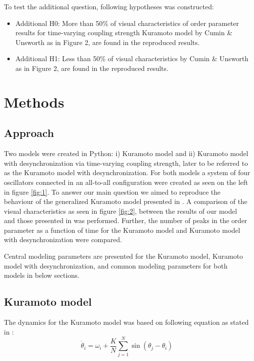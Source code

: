 \documentclass{article}
\begin{document}
To test the additional question, following hypotheses was constructed:
\begin{itemize}
    \item Additional H0: More than 50\% of visual characteristics of order parameter results for time-varying coupling strength Kuramoto model by Cumin \& Unsworth \cite{Cumin} as in Figure 2, are found in the reproduced results.
    \item Additional H1: Less than 50\% of visual characteristics by Cumin \& Unsworth \cite{Cumin} as in Figure 2, are found in the reproduced results.
\end{itemize}

\section{Methods}

\subsection{Approach}
Two models were created in Python: i) Kuramoto model and ii) Kuramoto model with desynchronization via time-varying coupling strength, later to be referred to as the Kuramoto model with desynchronization. For both models a system of four oscillators connected in an all-to-all configuration were created as seen on the left in figure \ref{fig:1}. To answer our main question we aimed to reproduce the behaviour of the generalized Kuramoto model presented in \cite{Cumin}. A comparison of the visual characteristics as seen in figure \ref{fig:2}, between the results of our model and those presented in \cite{Cumin} was performed. Further, the number of peaks in the order parameter as a function of time for the Kuramoto model and Kuramoto model with desynchronization were compared. 

Central modeling parameters are presented for the Kuramoto model, Kuramoto model with desynchronization, and common modeling parameters for both models in below sections.

\subsection{Kuramoto model}

The dynamics for the Kuramoto model was based on following equation as stated in \cite{Cumin}:
\begin{equation}
    \dot{\theta}_i = \omega_i + \frac{K}{N} \sum_{j=1}^{N} \sin(\theta_j - \theta_i)
\end{equation}
\end{document}
